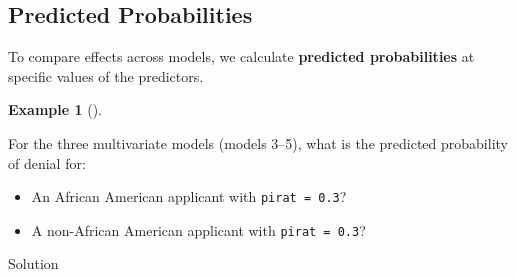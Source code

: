 \documentclass[
  12pt,
  a4paper,
]{scrbook}
\providecommand{\tightlist}{%
  \setlength{\itemsep}{0pt}\setlength{\parskip}{0pt}}
\renewcommand{\tightlist}{\setlength{\itemsep}{0.5\baselineskip}\setlength{\parskip}{0.2\baselineskip}}
\theoremstyle{plain}
\theoremstyle{definition}
\newtheorem{example}{Example}[chapter]
\theoremstyle{remark}
\begin{document}
\subsection{Predicted Probabilities}\label{predicted-probabilities}

To compare effects across models, we calculate \textbf{predicted
probabilities} at specific values of the predictors.

\begin{example}[]\protect\hypertarget{exm-3}{}\label{exm-3}

For the three multivariate models (models 3--5), what is the predicted
probability of denial for:

\begin{itemize}
\tightlist
\item
  An African American applicant with \texttt{pirat\ =\ 0.3}?
\item
  A non-African American applicant with \texttt{pirat\ =\ 0.3}?
\end{itemize}

\end{example}

Solution
\end{document}
